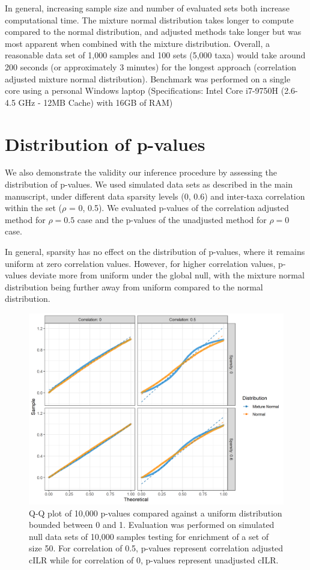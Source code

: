 \documentclass{article}
\begin{document}
In general, increasing sample size and number of evaluated sets both increase computational time. The mixture normal distribution takes longer to compute compared to the normal distribution, and adjusted methods take longer but was most apparent when combined with the mixture distribution. Overall, a reasonable data set of 1,000 samples and 100 sets (5,000 taxa) would take around 200 seconds (or approximately 3 minutes) for the longest approach (correlation adjusted mixture normal distribution). Benchmark was performed on a single core using a personal Windows laptop (Specifications: Intel Core i7-9750H (2.6-4.5 GHz - 12MB Cache) with 16GB of RAM)

\section{Distribution of p-values}
We also demonstrate the validity our inference procedure by assessing the distribution of p-values. We used simulated data sets as described in the main manuscript, under different data sparsity levels (0, 0.6) and inter-taxa correlation within the set ($\rho$ = 0, 0.5). We evaluated p-values of the correlation adjusted method for $\rho = 0.5$ case and the p-values of the unadjusted method for $\rho = 0$ case.  

In general, sparsity has no effect on the distribution of p-values, where it remains uniform at zero correlation values. However, for higher correlation values, p-values deviate more from uniform under the global null, with the mixture normal distribution being further away from uniform compared to the normal distribution. 

\begin{figure}[!ht]
    \centering
    \includegraphics[width=\textwidth]{figures/pval_distr.png}
    \caption{Q-Q plot of 10,000 p-values compared against a uniform distribution bounded between 0 and 1. Evaluation was performed on simulated null data sets of 10,000 samples testing for enrichment of a set of size 50. For correlation of 0.5, p-values represent correlation adjusted cILR while for correlation of 0, p-values represent unadjusted cILR.}
    \label{fig:s2}
\end{figure}

\newpage
{}

\end{document}
